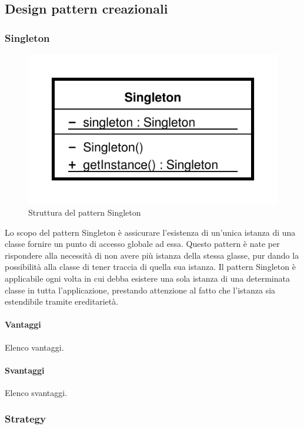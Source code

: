 \documentclass[../SpecificaTecnica.tex]{subfiles}
\begin{document}
	\subsection{Design pattern creazionali}
		\subsubsection{Singleton}
			\begin{figure}[!h]
				\centering
				\includegraphics[scale=0.5]{pattern/singleton}
				\caption{Struttura del pattern Singleton}
				\label{fig:Struttura_Observer}
			\end{figure}
			
			Lo scopo del pattern Singleton è assicurare l'esistenza di un'unica istanza di una classe fornire un punto di accesso globale ad essa. Questo pattern è nate per rispondere alla necessità di non avere più istanza della stessa glasse, pur dando la possibilità alla classe di tener traccia di quella sua istanza. Il pattern Singleton è applicabile ogni volta in cui debba esistere una sola istanza di una determinata classe in tutta l'applicazione, prestando attenzione al fatto che l'istanza sia estendibile tramite ereditarietà.
			\paragraph{Vantaggi}
				Elenco vantaggi.
			\paragraph{Svantaggi}
				Elenco svantaggi.
		\subsubsection{Strategy}
		
\end{document}
